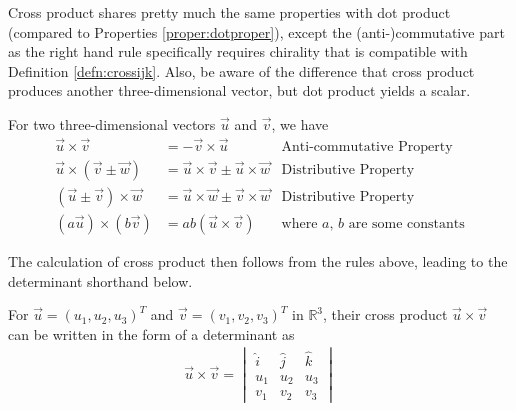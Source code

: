 \par
Cross product shares pretty much the same properties with dot product (compared to Properties \ref{proper:dotproper}), except the (anti-)commutative part as the right hand rule specifically requires chirality that is compatible with Definition \ref{defn:crossijk}. Also, be aware of the difference that cross product produces another three-dimensional vector, but dot product yields a scalar.
\begin{proper}
\label{proper:crossproper}
For two three-dimensional vectors $\vec{u}$ and $\vec{v}$, we have
\begin{align*}
\vec{u} \times \vec{v} &= -\vec{v} \times \vec{u} &\text{Anti-commutative Property} \\
\vec{u} \times (\vec{v} \pm \vec{w}) &= \vec{u} \times \vec{v} \pm \vec{u} \times \vec{w} &\text{Distributive Property} \\
(\vec{u} \pm \vec{v}) \times \vec{w} &= \vec{u} \times \vec{w} \pm \vec{v} \times \vec{w} &\text{Distributive Property} \\
(a\vec{u}) \times (b\vec{v}) &= ab(\vec{u} \times \vec{v}) &\text{where $a$, $b$ are some constants}
\end{align*}
\end{proper}
The calculation of cross product then follows from the rules above, leading to the determinant shorthand below. 
\begin{proper}
\label{proper:crossdet}
For $\vec{u} = (u_1, u_2, u_3)^T$ and $\vec{v} = (v_1, v_2, v_3)^T$ in $\mathbb{R}^3$, their cross product $\vec{u} \times \vec{v}$ can be written in the form of a determinant as
\begin{align*}
\vec{u} \times \vec{v} =
\begin{vmatrix}
\hat{i} & \hat{j} & \hat{k} \\
u_1 & u_2 & u_3 \\
v_1 & v_2 & v_3
\end{vmatrix}
\end{align*}
\end{proper}
